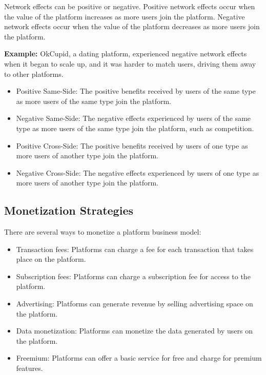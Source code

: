 Network effects can be positive or negative. Positive network effects occur when the value of 
the platform increases as more users join the platform. 
Negative network effects occur when the value of the platform decreases as more users join the platform.

\begin{callout}
	\textbf{Example:} OkCupid, a dating platform, experienced negative network effects when it began to scale up, and it was harder to match users, driving them away to other platforms.
\end{callout}

\begin{itemize}
	Types of Network Effects:
	\item Positive Same-Side: The positive benefits received by users of the same type as more users of the same type join the platform.
	\item Negative Same-Side: The negative effects experienced by users of the same type as more users of the same type join the platform, such as competition.
	\item Positive Cross-Side: The positive benefits received by users of one type as more users of another type join the platform.
	\item Negative Cross-Side: The negative effects experienced by users of one type as more users of another type join the platform.
\end{itemize}

\subsection{Monetization Strategies}
There are several ways to monetize a platform business model:

\begin{itemize}
	\item Transaction fees: Platforms can charge a fee for each transaction that takes place on the platform.
	\item Subscription fees: Platforms can charge a subscription fee for access to the platform.
	\item Advertising: Platforms can generate revenue by selling advertising space on the platform.
	\item Data monetization: Platforms can monetize the data generated by users on the platform.
	\item Freemium: Platforms can offer a basic service for free and charge for premium features.
\end{itemize}

